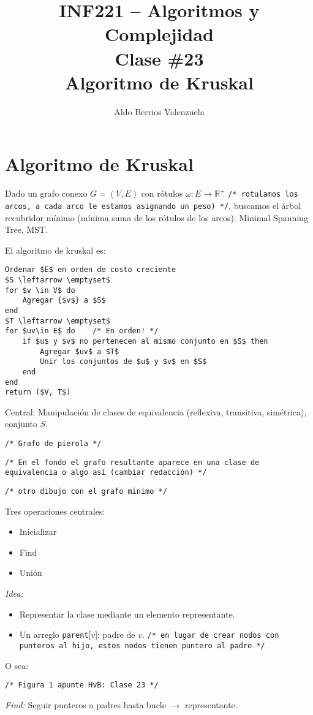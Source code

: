 \documentclass[english, spanish, fleqn, 10pt]{article}
\author{Aldo Berrios Valenzuela}
\title{INF221 -- Algoritmos y Complejidad\\[.4\baselineskip]
	Clase \#23\\
	Algoritmo de Kruskal}
\newcommand{\comentarioc}[1]{\texttt{\textcolor{webred}{/* #1 */}}}
\numberwithin{equation}{section}
\newcommand{\nparentesis}[1]{\left( #1 \right)}
\theoremstyle{definition}
\begin{document}
\maketitle

\section{Algoritmo de Kruskal}
Dado un grafo conexo $G = \nparentesis{V, E}$ con rótulos $\omega: E\rightarrow \mathbb{R}^+$ \comentarioc{rotulamos los arcos, a cada arco le estamos asignando un peso)}, buscamos el árbol recubridor mínimo (mínima suma de los rótulos de los arcos). Minimal Spanning Tree, MST.

El algoritmo de kruskal es:
\begin{lstlisting}
Ordenar $E$ en orden de costo creciente
$S \leftarrow \emptyset$
for $v \in V$ do
	Agregar {$v$} a $S$
end
$T \leftarrow \emptyset$
for $uv\in E$ do	/* En orden! */
	if $u$ y $v$ no pertenecen al mismo conjunto en $S$ then
		Agregar $uv$ a $T$
		Unir los conjuntos de $u$ y $v$ en $S$
	end
end
return ($V, T$)
\end{lstlisting}

Central: Manipulación de clases de equivalencia (reflexiva, transitiva, simétrica), conjunto $S$.
\begin{center}
	\comentarioc{Grafo de pierola}
\end{center}
\comentarioc{En el fondo el grafo resultante aparece en una clase de equivalencia o algo así (cambiar redacción)}
\begin{center}
	\comentarioc{otro dibujo con el grafo minimo}
\end{center}
Tres operaciones centrales:
\begin{itemize}
	\item Inicializar
	\item Find
	\item Unión
\end{itemize}
\emph{Idea:} 
\begin{itemize}
	\item Representar la clase mediante un elemento representante.
	\item Un arreglo \texttt{parent}[$v$]: padre de $v$. \comentarioc{en lugar de crear nodos con punteros al hijo, estos nodos tienen puntero al padre}
\end{itemize}
O sea:
\begin{center}
	\comentarioc{Figura 1 apunte HvB: Clase 23}
\end{center}
\emph{Find:} Seguir punteros  a padres hasta bucle $\rightarrow$ representante.
\end{document}
